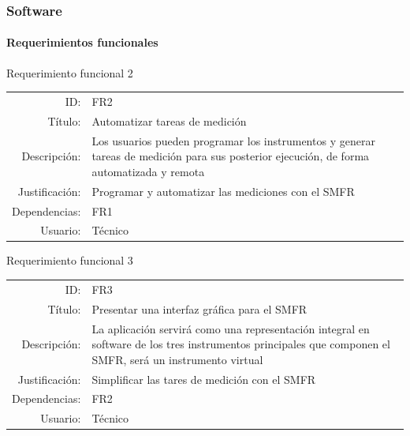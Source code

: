 \documentclass[xcolor=pdftext, table]{beamer}
\begin{document}
	\begin{frame} 
		\frametitle{Software}
		\framesubtitle{Requerimientos funcionales}


		\begin{block}{Requerimiento funcional 2}
			\begin{table}
				\tiny
				\begin{tabular}{rp{10cm}}	
					{ID:} & {FR2} \\
					{Título:} &  {Automatizar tareas de medición} \\
					{Descripción:} & {Los usuarios pueden programar los instrumentos y generar tareas de medición para sus posterior ejecución, de forma automatizada y remota} \\
					{Justificación:} & {Programar y automatizar las mediciones con el SMFR}\\
					{Dependencias:} & {FR1} \\
					{Usuario:} & {Técnico}	
				\end{tabular}
			\end{table}			
		\end{block}			
	
		\begin{block}{Requerimiento funcional 3}
			\begin{table}
				\tiny
				\begin{tabular}{rp{10cm}}	
					{ID:} & {FR3} \\
					{Título:} & {Presentar una interfaz gráfica para el SMFR} \\
					{Descripción:} & 	{La aplicación servirá como una representación integral en software de los tres instrumentos principales que componen el SMFR, será un instrumento virtual} \\
					{Justificación:} & {Simplificar las tares de medición con el SMFR} \\
					{Dependencias:} & {FR2} \\
					{Usuario:} & {Técnico} \\
				\end{tabular}
			\end{table}			
		\end{block}		
	
	\end{frame}
\end{document}
